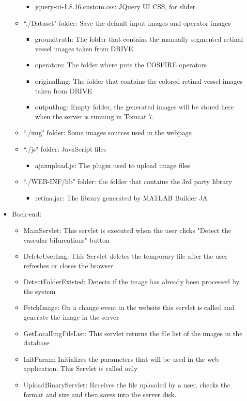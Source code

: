 \documentclass[a4paper]{article}
\begin{document}
\begin{itemize}
\begin{itemize}
\begin{itemize}
	\item jquery-ui-1.8.16.custom.css:	JQuery UI CSS, for slider
	\end{itemize}
\item ``./Dataset" folder: Save the default input images and operator images
	\begin{itemize}
	\item groundtruth: 	The folder that contains the manually segmented retinal vessel images taken from DRIVE
	\item operators:		The folder where puts the COSFIRE operators
	\item originalImg:	The folder that contains the colored retinal vessel images taken from DRIVE
	\item outputImg:		Empty folder, the generated images will be stored here when the server is running in Tomcat 7.
	\end{itemize}	
\item ``./img" folder: Some images sources used in the webpage
\item ``./js" folder: JavaScript files
	\begin{itemize}
	\item ajaxupload.js:	The plugin used to upload image files
	\end{itemize}
\item``./WEB-INF/lib" folder: the folder that contains the 3rd party library 
	\begin{itemize}
	\item retina.jar: The library generated by MATLAB Builder JA
	\end{itemize}		
\end{itemize}

\item Back-end:
	\begin{itemize}
	\item MainServlet: 		This servlet is executed when the user clicks "Detect the vascular bifurcations" button
	\item DeleteUserImg: 		This Servlet deletes the temporary file after the user refreshes or closes the browser 
	\item DetectFolderExisted: 	Detects if the image has already been processed by the system
	\item FetchImage: 		On a change event in the website this servlet is called and generate the image in the server
	\item GetLocalImgFileList:  	This servlet returns the file list of the images in the database	
	\item InitParam:			Initializes the parameters that will be used in the web application. This Servlet is called only
	\item UploadBinaryServlet: Receives the file uploaded by a user, checks the format and size and then saves into the server disk.
	\end{itemize}

\end{itemize}
\end{document}
